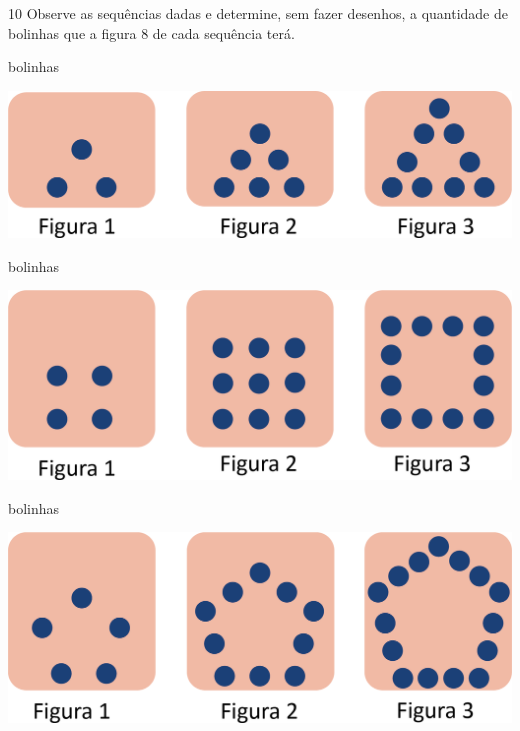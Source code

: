 \pagebreak

\num{10} Observe as sequências dadas e determine, sem fazer desenhos, a
quantidade de bolinhas que a figura 8 de cada sequência terá.

\begin{escolha}
\item {} bolinhas

\includegraphics[width=.7\textwidth]{./media/image33.png}

\item {} bolinhas

\includegraphics[width=.7\textwidth]{./media/image34.png}

\item {} bolinhas

\includegraphics[width=.7\textwidth]{./media/image35.png}
\end{escolha}

